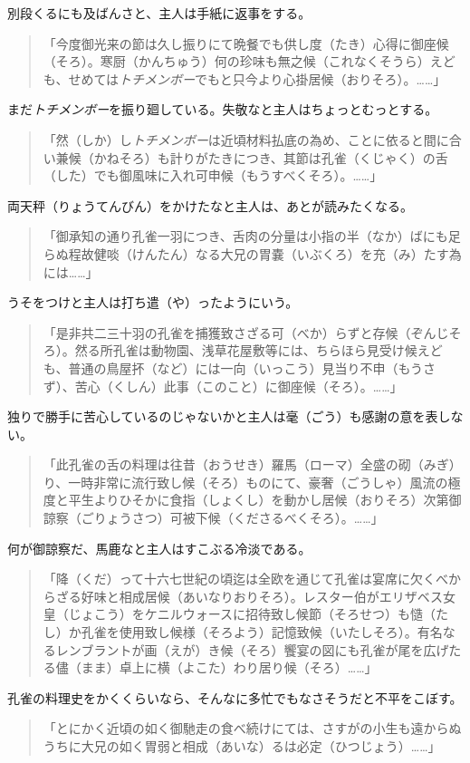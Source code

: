 \documentclass{book}
\begin{document}
別段くるにも及ばんさと、主人は手紙に返事をする。

\blockquote{「今度御光来の節は久し振りにて晩餐でも供し度（たき）心得に御座候（そろ）。寒厨（かんちゅう）何の珍味も無之候（これなくそうら）えども、せめては\emph{トチメンボー}でもと只今より心掛居候（おりそろ）。\ldots{}\ldots{}」}

まだ\emph{トチメンボー}を振り廻している。失敬なと主人はちょっとむっとする。

\blockquote{「然（しか）し\emph{トチメンボー}は近頃材料払底の為め、ことに依ると間に合い兼候（かねそろ）も計りがたきにつき、其節は孔雀（くじゃく）の舌（した）でも御風味に入れ可申候（もうすべくそろ）。\ldots{}\ldots{}」}

両天秤（りょうてんびん）をかけたなと主人は、あとが読みたくなる。

\blockquote{「御承知の通り孔雀一羽につき、舌肉の分量は小指の半（なか）ばにも足らぬ程故健啖（けんたん）なる大兄の胃嚢（いぶくろ）を充（み）たす為には\ldots{}\ldots{}」}

うそをつけと主人は打ち遣（や）ったようにいう。

\blockquote{「是非共二三十羽の孔雀を捕獲致さざる可（べか）らずと存候（ぞんじそろ）。然る所孔雀は動物園、浅草花屋敷等には、ちらほら見受け候えども、普通の鳥屋抔（など）には一向（いっこう）見当り不申（もうさず）、苦心（くしん）此事（このこと）に御座候（そろ）。\ldots{}\ldots{}」}

独りで勝手に苦心しているのじゃないかと主人は毫（ごう）も感謝の意を表しない。

\blockquote{「此孔雀の舌の料理は往昔（おうせき）羅馬（ローマ）全盛の砌（みぎ）り、一時非常に流行致し候（そろ）ものにて、豪奢（ごうしゃ）風流の極度と平生よりひそかに食指（しょくし）を動かし居候（おりそろ）次第御諒察（ごりょうさつ）可被下候（くださるべくそろ）。\ldots{}\ldots{}」}

何が御諒察だ、馬鹿なと主人はすこぶる冷淡である。

\blockquote{「降（くだ）って十六七世紀の頃迄は全欧を通じて孔雀は宴席に欠くべからざる好味と相成居候（あいなりおりそろ）。レスター伯がエリザベス女皇（じょこう）をケニルウォースに招待致し候節（そろせつ）も慥（たし）か孔雀を使用致し候様（そろよう）記憶致候（いたしそろ）。有名なるレンブラントが画（えが）き候（そろ）饗宴の図にも孔雀が尾を広げたる儘（まま）卓上に横（よこた）わり居り候（そろ）\ldots{}\ldots{}」}

孔雀の料理史をかくくらいなら、そんなに多忙でもなさそうだと不平をこぼす。

\blockquote{「とにかく近頃の如く御馳走の食べ続けにては、さすがの小生も遠からぬうちに大兄の如く胃弱と相成（あいな）るは必定（ひつじょう）\ldots{}\ldots{}」}
\end{document}
